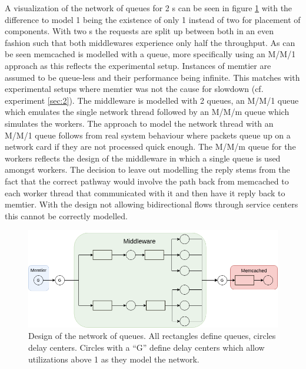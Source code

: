             A visualization of the network of queues for 2 \mw{}s can be seen in figure \ref{fig:noq_2mw} with the
            difference to model 1 being the existence of only 1 \mw{} instead of two for placement of components. With
            two \mw{}s the requests are split up between both in an even fashion such that both middlewares experience
            only half the throughput.\newline
            As can be seen memcached is modelled with a queue, more specifically using an M/M/1 approach as this
            reflects the experimental setup. Instances of memtier are assumed to be queue-less and their performance
            being infinite. This matches with experimental setups where memtier was not the cause for slowdown (cf.
            experiment \ref{sec:2}). The middleware is modelled with 2 queues, an M/M/1 queue which emulates the
            single network thread followed by an M/M/m queue which simulates the workers. The approach to model the
            network thread with an M/M/1 queue follows from real system behaviour where packets queue up on a network
            card if they are not processed quick enough. The M/M/m queue for the workers reflects the design of the
            middleware in which a single queue is used amongst workers. The decision to leave out modelling the reply
            stems from the fact that the correct pathway would involve the path back from memcached to each worker
            thread that communicated with it and then have it reply back to memtier. With the design not allowing
            bidirectional flows through service centers this cannot be correctly modelled.

            \begin{figure}
                \includegraphics[width=0.7\linewidth]{graphics/network-of-queues_2-middlewares.png}
                \caption{Design of the network of queues. All rectangles define queues, circles delay centers. Circles
                         with a ``G'' define delay centers which allow utilizations above 1 as they model the
                         network.\label{fig:noq_2mw}}
            \end{figure}

